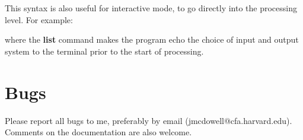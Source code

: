 This syntax is also useful for interactive mode, to go directly into
the processing level. For example:
\begin{quote} \end{quote}
where the {\bf list} command makes the program echo
the choice of input and output system to the terminal prior to
the start of processing.

\section{Bugs}

Please report all bugs to me, preferably by email (jmcdowell@cfa.harvard.edu).
Comments on the documentation are also welcome.

